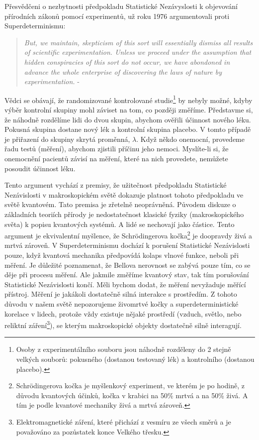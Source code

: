 Přesvědčeni o nezbytnosti předpokladu Statistické Nezávyslosti k objevování přírodních zákonů pomocí experimentů, \citeauthor{ArgSciMeth:1} už roku 1976 argumentovali proti Superdeterminismu:
\begin{quote}
    \emph{But, we maintain, skepticism of this sort will essentially dismiss all results of scientific experimentation. Unless we proceed under the assumption that hidden conspiracies of this sort do not occur, we have abondoned in advance the whole enterprise of discovering the laws of nature by experimentation.} - \cite{ArgSciMeth:1}
\end{quote}

Vědci se obávají, že randomizované kontrolované studie\footnote[14]{Osoby z experimentálního souboru jsou náhodně rozděleny do 2 stejně velkých souborů: pokusného (dostanou testovaný lék) a kontrolního (dostanou placebo).} by nebyly možné, kdyby výběr kontrolní skupiny mohl záviset na tom, co později změříme. Představme si, že náhodně rozdělíme lidi do dvou skupin, abychom ověřili účinnost nového léku. Pokusná skupina dostane nový lék a kontrolní skupina placebo. V tomto případě je přiřazení do skupiny skrytá proměnná, $\lambda$. Když někdo onemocní, provedeme řadu testů (měření), abychom zjistili příčinu jeho nemoci. Myslíte-li si, že onemocnění pacientů závisí na měření, které na nich provedete, nemůžete posoudit účinnost léku.

Tento argument vychází z premisy, že užitečnost předpokladu Statistické Nezávislosti v makroskopickém světě dokazuje platnost tohoto předpokladu ve světě kvantovém. Tato premisa je zřetelně neoprávněná. Původem diskuze o základních teoriích přírody je nedostatečnost klasické fyziky (makroskopického světa) k popisu kvantových systémů. A lidé se nechovají jako částice. Tento argument je ekvivalentní myšlence, že Schrödingerova kočka\footnote[15]{Schrödingerova kočka je myšlenkový experiment, ve kterém je po hodině, z důvodu kvantových účinků, kočka v krabici na 50\% mrtvá a na 50\% živá. A tím je podle kvantové mechaniky živá a mrtvá zároveň.} je doopravdy živá a mrtvá zároveň. V Superdeterminismu dochází k porušení Statistické Nezávislosti pouze, když kvantová mechanika předpovídá kolaps vlnové funkce, neboli při měření. Je důležité poznamenat, že Bellova nerovnost se zabývá pouze tím, co se děje při procesu měření. Ale jakmile změříme kvantový stav, tak tím porušování Statistické Nezávislosti končí. Měli bychom dodat, že měření nevyžaduje měřící přístroj. Měření je jakákoli dostatečně silná interakce s prostředím. Z tohoto důvodu v našem světě nepozorujeme živomrtvé kočky a superdeterministické korelace v lidech, protože vždy existuje nějaké prostředí (vzduch, světlo, nebo reliktní záření\footnote[16]{Elektromagnetické záření, které přichází z vesmíru ze všech směrů a je považováno za pozůstatek konce Velkého třesku.}), se kterým makroskopické objekty dostatečně silně interagují.